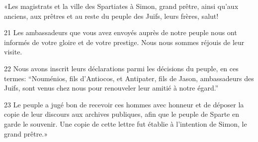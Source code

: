 «Les magistrats et la ville des Spartiates à Simon, grand prêtre, ainsi qu’aux anciens, aux prêtres et au reste du peuple des Juifs, leurs frères, salut!

21 Les ambassadeurs que vous avez envoyés auprès de notre peuple nous ont informés de votre gloire et de votre prestige. Nous nous sommes réjouis de leur visite.

22 Nous avons inscrit leurs déclarations parmi les décisions du peuple, en ces termes: “Nouménios, fils d’Antiocos, et Antipater, fils de Jason, ambassadeurs des Juifs, sont venus chez nous pour renouveler leur amitié à notre égard.”

23 Le peuple a jugé bon de recevoir ces hommes avec honneur et de déposer la copie de leur discours aux archives publiques, afin que le peuple de Sparte en garde le souvenir. Une copie de cette lettre fut établie à l’intention de Simon, le grand prêtre.»
